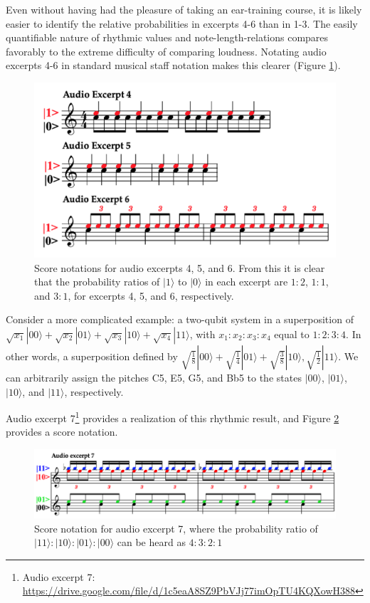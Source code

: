 \documentclass[10pt,twocolumn]{article}
\begin{document}
Even without having had the pleasure of taking an ear-training course, it is likely easier to identify the relative probabilities in excerpts 4-6 than in 1-3. The easily quantifiable nature of rhythmic values and note-length-relations compares favorably to the extreme difficulty of comparing loudness. Notating audio excerpts 4-6 in standard musical staff notation makes this clearer (Figure \ref{fig:Figure2}).

\begin{figure}[h]

        \centering
        \includegraphics[width=.45\textwidth]{fig/Figure 2.png} %

        \caption{Score notations for audio excerpts 4, 5, and 6. From this it is clear that the probability ratios of $|1\rangle$ to $|0\rangle$ in each excerpt are $1:2$, $1:1$, and $3:1$, for excerpts 4, 5, and 6, respectively.}
        \label{fig:Figure2}
\end{figure}

Consider a more complicated example: a two-qubit system in a superposition of $\sqrt{x_1}|00\rangle + \sqrt{x_2}|01\rangle + \sqrt{x_3}|10\rangle + \sqrt{x_4}|11\rangle$, with $x_1:x_2:x_3:x_4$ equal to $1:2:3:4$. In other words, a superposition defined by $\sqrt{\frac{1}{8}}|00\rangle + \sqrt{\frac{1}{4}}|01\rangle + \sqrt{\frac{3}{8}}|10\rangle, \sqrt{\frac{1}{2}}|11\rangle$. We can arbitrarily assign the pitches C5, E5, G5, and Bb5 to the states $|00\rangle$, $|01\rangle$, $|10\rangle$, and $|11\rangle$, respectively.

Audio excerpt 7\footnote{Audio excerpt 7: \url{https://drive.google.com/file/d/1c5eaA8SZ9PbVJj77imOpTU4KQXowH388}} provides a realization of this rhythmic result, and Figure \ref{fig:Figure3} provides a score notation.

\begin{figure}[h]
\centering
  \includegraphics[width=.45\textwidth]{fig/Figure 3.png}
\caption{Score notation for audio excerpt 7, where the probability ratio of $|11\rangle : |10\rangle : |01\rangle : |00\rangle$ can be heard as $4:3:2:1$}
\label{fig:Figure3}
\end{figure}
\end{document}
